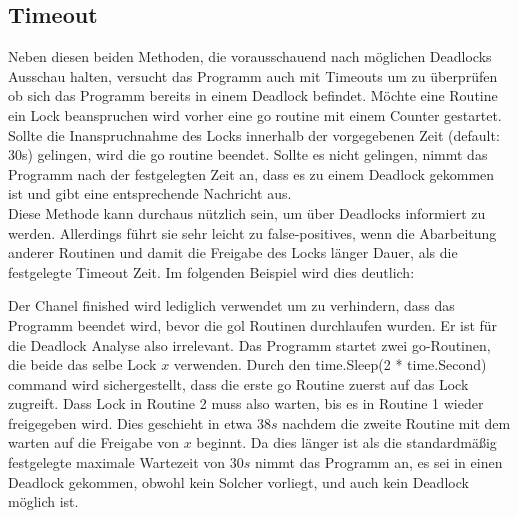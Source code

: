 \subsection{Timeout}
Neben diesen beiden Methoden, die vorausschauend nach möglichen Deadlocks 
Ausschau halten, versucht das Programm auch mit Timeouts um zu überprüfen ob 
sich das Programm bereits in einem Deadlock befindet. Möchte eine Routine ein 
Lock beanspruchen wird vorher eine go routine mit einem Counter gestartet.
Sollte die Inanspruchnahme des Locks innerhalb der vorgegebenen Zeit 
(default: 30s) gelingen, wird die go routine beendet. Sollte es nicht gelingen,
nimmt das Programm nach der festgelegten Zeit an, dass es zu einem Deadlock 
gekommen ist und gibt eine entsprechende Nachricht aus.\\
Diese Methode kann
durchaus nützlich sein, um über Deadlocks informiert zu werden. Allerdings führt
sie sehr leicht zu false-positives, wenn die Abarbeitung anderer Routinen und 
damit die Freigabe des Locks länger Dauer, als die festgelegte Timeout Zeit.
Im folgenden Beispiel wird dies deutlich:
\begin{figure}[H]
    
\end{figure}
Der Chanel finished wird lediglich verwendet um zu verhindern, dass das Programm 
beendet wird, bevor die gol Routinen durchlaufen wurden. Er ist für die Deadlock
Analyse also irrelevant. Das Programm startet zwei go-Routinen, die beide das 
selbe Lock $x$ verwenden. Durch den time.Sleep(2 * time.Second) command wird 
sichergestellt, dass die erste go Routine zuerst auf das Lock zugreift. 
Dass Lock in Routine 2 muss also warten, bis es in Routine 1 wieder freigegeben
wird. Dies geschieht in etwa $38 s$ nachdem die zweite Routine mit dem warten 
auf die Freigabe von $x$ beginnt. Da dies länger ist als die standardmäßig
festgelegte maximale Wartezeit von $30 s$ nimmt das Programm an, es sei in einen 
Deadlock gekommen, obwohl kein Solcher vorliegt, und auch kein Deadlock möglich 
ist.

